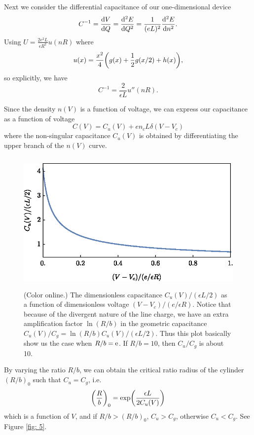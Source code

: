 \documentclass[10pt]{article}
\begin{document}
Next we consider the differential capacitance of our one-dimensional device
\begin{equation}
	C^{-1} = \dv{V}{Q} = \dv[2]{E}{Q} = \frac{1}{(eL)^2} \dv[2]{E}{n}.
\end{equation}
Using $U = \frac{2 e^2 L}{\epsilon R^2} u(nR)$ where
\begin{equation}
	u(x) = \frac{x^2}{4} \qty(g(x) + \frac{1}{2} g(x/2) + h(x)),
\end{equation}
so explicitly, we have
\begin{equation}
	C^{-1} = \frac{2}{\epsilon L} u''(nR).
\end{equation}

Since the density $n(V)$ is a function of voltage, we can express our capacitance as a function of voltage
\begin{equation}
	C(V) = C_u(V) + en_cL \delta(V-V_c)
\end{equation}
where the non-singular capacitance $C_u(V)$ is obtained by differentiating the upper branch of the $n(V)$ curve.
\begin{figure}[H]
	\centering
	\includegraphics[height=7cm]{capacitance.eps}
	\caption{(Color online.) The dimensionless capacitance $C_u(V)/(\epsilon L/2)$ as a function of dimensionless voltage $(V-V_c)/(e/\epsilon R)$. Notice that because of the divergent nature of the line charge, we have an extra amplification factor $\ln(R/b)$ in the geometric capacitance $C_u(V)/C_g = \ln(R/b) C_u(V)/(\epsilon L/2)$. Thus this plot basically show us the case when $R/b = {\mathrm{e}}$. If $R/b = 10$, then $C_u/C_g$ is about 10.}
	\label{fig: 4}
\end{figure}

By varying the ratio $R/b$, we can obtain the critical ratio radius of the cylinder $(R/b)_0$ such that $C_u = C_g$, i.e.
\begin{equation}
	\qty(\frac{R}{b})_0 = \exp(\frac{\epsilon L}{2 C_u(V)})
\end{equation}
which is a function of $V$, and if $R/b > (R/b)_0$, $C_u > C_g$, otherwise $C_u < C_g$. See Figure \ref{fig: 5}.
\end{document}
